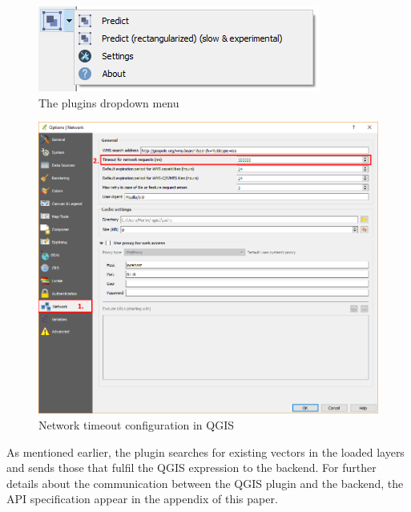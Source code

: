 \begin{figure}[H]
    \centering
	\includegraphics[width=0.5\linewidth]{chapters/introduction/images/plugin_dropdown.png}
	\caption{The plugins dropdown menu}
	\label{fig:introduction:plugin_dropdown}
\end{figure}

\begin{figure}[H]
    \centering
	\includegraphics[width=0.8\linewidth]{chapters/introduction/images/qgs_timeout.png}
	\caption{Network timeout configuration in QGIS}
	\label{fig:introduction:qgis_timeout}
\end{figure}

As mentioned earlier, the plugin searches for existing vectors in the loaded layers and sends those that fulfil the QGIS expression  \textbf{} to the backend. For further details about the communication between the QGIS plugin and the backend, the API specification appear in the appendix of this paper.
